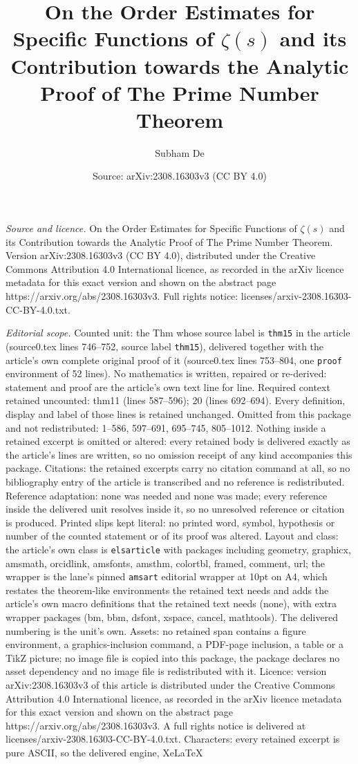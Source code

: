 \documentclass[10pt,a4paper]{amsart}
\title[On the Order Estimates for Specific Functions of $\zeta(s)$ ]{On the Order Estimates for Specific Functions of $\zeta(s)$ and its Contribution towards the Analytic Proof of The Prime Number Theorem}
\author{Subham De}
\date{Source: arXiv:2308.16303v3 (CC BY 4.0)}
\begin{document}
\maketitle

\noindent\emph{Source and licence.} On the Order Estimates for Specific Functions of $\zeta(s)$ and its Contribution towards the Analytic Proof of The Prime Number Theorem. Version arXiv:2308.16303v3 (CC BY 4.0), distributed under the Creative Commons Attribution 4.0 International licence, as recorded in the arXiv licence metadata for this exact version and shown on the abstract page https://arxiv.org/abs/2308.16303v3. Full rights notice: licenses/arxiv-2308.16303-CC-BY-4.0.txt.\par\smallskip

\noindent\textit{Editorial scope.} Counted unit: the Thm whose source label is \texttt{thm15} in the article (source0.tex lines 746--752, source label \texttt{thm15}), delivered together with the article's own complete original proof of it (source0.tex lines 753--804, one \texttt{proof} environment of 52 lines). No mathematics is written, repaired or re-derived: statement and proof are the article's own text line for line. Required context retained uncounted: thm11 (lines 587--596); 20 (lines 692--694). Every definition, display and label of those lines is retained unchanged. Omitted from this package and not redistributed: 1--586, 597--691, 695--745, 805--1012. Nothing inside a retained excerpt is omitted or altered: every retained body is delivered exactly as the article's lines are written, so no omission receipt of any kind accompanies this package. Citations: the retained excerpts carry no citation command at all, so no bibliography entry of the article is transcribed and no reference is redistributed. Reference adaptation: none was needed and none was made; every reference inside the delivered unit resolves inside it, so no unresolved reference or citation is produced. Printed slips kept literal: no printed word, symbol, hypothesis or number of the counted statement or of its proof was altered. Layout and class: the article's own class is \texttt{elsarticle} with packages including geometry, graphicx, amsmath, orcidlink, amsfonts, amsthm, colortbl, framed, comment, url; the wrapper is the lane's pinned \texttt{amsart} editorial wrapper at 10pt on A4, which restates the theorem-like environments the retained text needs and adds the article's own macro definitions that the retained text needs (none), with extra wrapper packages (bm, bbm, dsfont, xspace, cancel, mathtools). The delivered numbering is the unit's own. Assets: no retained span contains a figure environment, a graphics-inclusion command, a PDF-page inclusion, a table or a TikZ picture; no image file is copied into this package, the package declares no asset dependency and no image file is redistributed with it. Licence: version arXiv:2308.16303v3 of this article is distributed under the Creative Commons Attribution 4.0 International licence, as recorded in the arXiv licence metadata for this exact version and shown on the abstract page https://arxiv.org/abs/2308.16303v3. A full rights notice is delivered at licenses/arxiv-2308.16303-CC-BY-4.0.txt. Characters: every retained excerpt is pure ASCII, so the delivered engine, XeLaTeX 
\end{document}
